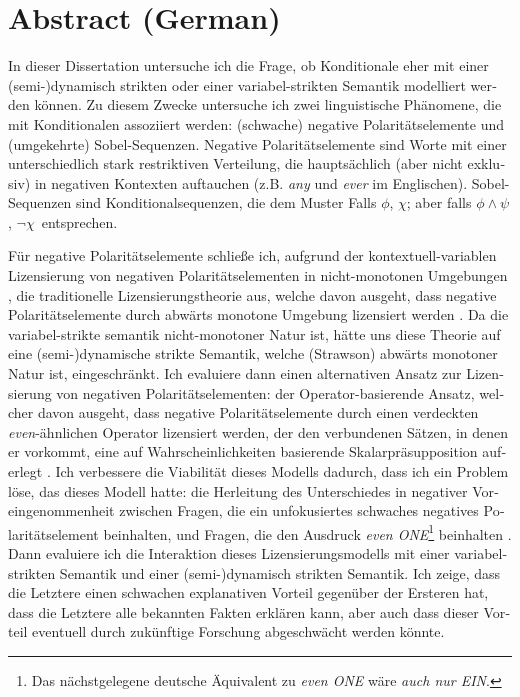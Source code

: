 \cleardoublepage
\section*{Abstract (German)}%
\begin{otherlanguage}{ngerman}
In dieser Dissertation untersuche ich die Frage, ob Konditionale eher mit einer \mbox{(semi-)}\linebreak dynamisch strikten \parencite{Fintel2001,Gillies2007} oder einer variabel-strikten Semantik \parencite{Stalnaker1968,Lewis1973} modelliert werden können. Zu diesem Zwecke untersuche ich zwei linguistische Phänomene, die mit Konditionalen assoziiert werden: (schwache) negative Polaritätselemente und (umgekehrte) Sobel-Sequenzen. Negative Polaritätselemente sind Worte mit einer unterschiedlich stark restriktiven Verteilung, die hauptsächlich (aber nicht exklusiv) in negativen Kontexten auftauchen (z.B. \textit{any} und \textit{ever} im Englischen). Sobel-Sequenzen sind Konditionalsequenzen, die dem Muster \glqq Falls $\phi$, $\chi$; aber falls $\phi\land\psi$, $\neg\chi$\grqq\ entsprechen.
    
Für negative Polaritätselemente schließe ich, aufgrund der kontextuell-variablen Lizensierung von negativen Polaritätselementen in nicht-monotonen Umgebungen \parencite{Crnic2011},  die traditionelle Lizensierungstheorie aus, welche davon ausgeht, dass negative Polaritätselemente durch abwärts monotone Umgebung lizensiert werden \parencite{Fauconnier1975a,Fauconnier1975b,Ladusaw1980}. Da die variabel-strikte semantik nicht-\linebreak monotoner Natur ist, hätte uns diese Theorie auf eine (semi-)dynamische strikte Semantik, welche (Strawson) abwärts monotoner Natur ist, eingeschränkt. Ich evaluiere dann einen alternativen Ansatz zur Lizensierung von negativen Polaritätselementen: der Operator-basierende Ansatz, welcher davon ausgeht, dass negative Polaritätselemente durch einen verdeckten \textit{even}-ähnlichen Operator lizensiert werden, der den verbundenen Sätzen, in denen er vorkommt, eine auf Wahrscheinlichkeiten basierende Skalarpräsupposition auferlegt \parencite[siehe, unter anderem][]{Crnic2014-dogma,Crnic2014-nm}. Ich verbessere die Viabilität dieses Modells dadurch, dass ich ein Problem löse, das dieses Modell hatte: die Herleitung des Unterschiedes in negativer Voreingenommenheit zwischen Fragen, die ein unfokusiertes schwaches negatives Polaritätselement beinhalten, und Fragen, die den Ausdruck \textit{even ONE}\footnote{Das nächstgelegene deutsche Äquivalent zu \textit{even ONE} wäre \textit{auch nur EIN}.} beinhalten \parencite[vgl.][]{Crnic2014-dogma,Crnic2014-nm,Krassnig2018,Jeong2021,Jeong2022}. Dann evaluiere ich die Interaktion dieses Lizensierungsmodells mit einer variabel-strikten Semantik und einer (semi-)dynamisch strikten Semantik. Ich zeige, dass die Letztere einen schwachen explanativen Vorteil gegenüber der Ersteren hat, dass die Letztere alle bekannten Fakten erklären kann, aber auch dass dieser Vorteil eventuell durch zukünftige Forschung abgeschwächt werden könnte.
    

\end{otherlanguage}
